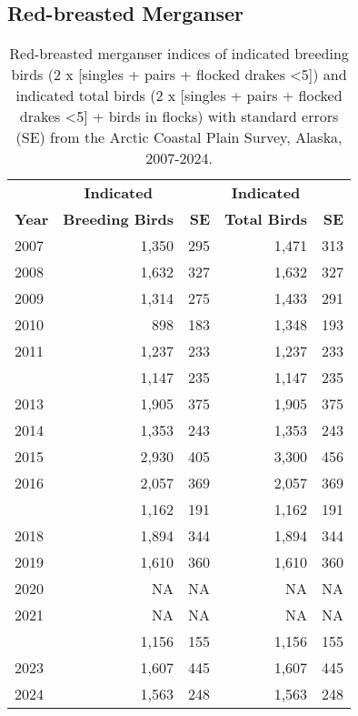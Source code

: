 \documentclass[
]{article}
\begin{document}
\subsection*{Red-breasted Merganser}\label{red-breasted-merganser-1}

\begingroup\fontsize{10}{12}\selectfont

\begin{longtable}[t]{lrrrr}

\caption{\label{tbl-RBME}Red-breasted merganser indices of indicated
breeding birds (2 x {[}singles + pairs + flocked drakes \textless5{]})
and indicated total birds (2 x {[}singles + pairs + flocked drakes
\textless5{]} + birds in flocks) with standard errors (SE) from the
Arctic Coastal Plain Survey, Alaska, 2007-2024.}

\tabularnewline

\\
\toprule
\multicolumn{1}{c}{\textbf{ }} & \multicolumn{1}{c}{\textbf{Indicated}} & \multicolumn{1}{c}{\textbf{ }} & \multicolumn{1}{c}{\textbf{Indicated}} & \multicolumn{1}{c}{\textbf{ }} \\
\cmidrule(l{3pt}r{3pt}){2-2} \cmidrule(l{3pt}r{3pt}){4-4}
\textbf{Year} & \textbf{Breeding Birds} & \textbf{SE} & \textbf{Total Birds} & \textbf{SE}\\
\midrule
2007 & 1,350 & 295 & 1,471 & 313\\
2008 & 1,632 & 327 & 1,632 & 327\\
2009 & 1,314 & 275 & 1,433 & 291\\
2010 & 898 & 183 & 1,348 & 193\\
2011 & 1,237 & 233 & 1,237 & 233\\
\addlinespace
2012 & 1,147 & 235 & 1,147 & 235\\
2013 & 1,905 & 375 & 1,905 & 375\\
2014 & 1,353 & 243 & 1,353 & 243\\
2015 & 2,930 & 405 & 3,300 & 456\\
2016 & 2,057 & 369 & 2,057 & 369\\
\addlinespace
2017 & 1,162 & 191 & 1,162 & 191\\
2018 & 1,894 & 344 & 1,894 & 344\\
2019 & 1,610 & 360 & 1,610 & 360\\
2020 & NA & NA & NA & NA\\
2021 & NA & NA & NA & NA\\
\addlinespace
2022 & 1,156 & 155 & 1,156 & 155\\
2023 & 1,607 & 445 & 1,607 & 445\\
2024 & 1,563 & 248 & 1,563 & 248\\
\bottomrule

\end{longtable}
\end{document}
